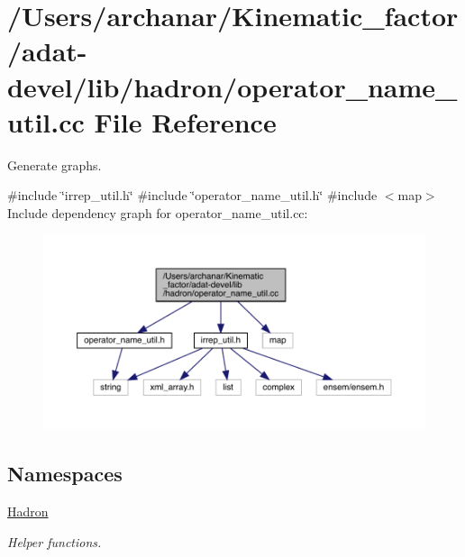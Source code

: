 \hypertarget{adat-devel_2lib_2hadron_2operator__name__util_8cc}{}\section{/\+Users/archanar/\+Kinematic\+\_\+factor/adat-\/devel/lib/hadron/operator\+\_\+name\+\_\+util.cc File Reference}
\label{adat-devel_2lib_2hadron_2operator__name__util_8cc}


Generate graphs.  


{\ttfamily \#include \char`\"{}irrep\+\_\+util.\+h\char`\"{}}\newline
{\ttfamily \#include \char`\"{}operator\+\_\+name\+\_\+util.\+h\char`\"{}}\newline
{\ttfamily \#include $<$map$>$}\newline
Include dependency graph for operator\+\_\+name\+\_\+util.\+cc\+:
\nopagebreak
\begin{figure}[H]
\begin{center}
\leavevmode
\includegraphics[width=350pt]{d6/da3/adat-devel_2lib_2hadron_2operator__name__util_8cc__incl}
\end{center}
\end{figure}
\subsection*{Namespaces}
\begin{DoxyCompactItemize}
\item 
 \mbox{\hyperlink{namespaceHadron}{Hadron}}
\begin{DoxyCompactList}\small\item\em Helper functions. \end{DoxyCompactList}\end{DoxyCompactItemize}
